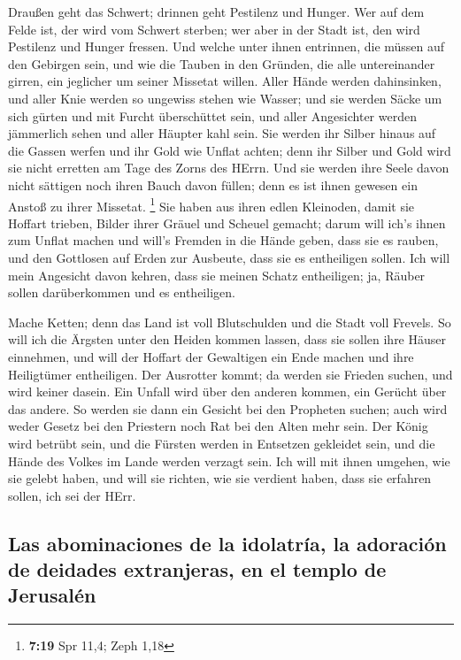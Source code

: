  Draußen geht das Schwert; drinnen geht Pestilenz und
Hunger. Wer auf dem Felde ist, der wird vom Schwert sterben; wer aber in
der Stadt ist, den wird Pestilenz und Hunger fressen. 
Und welche unter ihnen entrinnen, die müssen auf den Gebirgen sein, und
wie die Tauben in den Gründen, die alle untereinander girren, ein
jeglicher um seiner Missetat willen.  Aller Hände werden
dahinsinken, und aller Knie werden so ungewiss stehen wie Wasser;
 und sie werden Säcke um sich gürten und mit Furcht
überschüttet sein, und aller Angesichter werden jämmerlich sehen und
aller Häupter kahl sein.  Sie werden ihr Silber hinaus
auf die Gassen werfen und ihr Gold wie Unflat achten; denn ihr Silber
und Gold wird sie nicht erretten am Tage des Zorns des HErrn. Und sie
werden ihre Seele davon nicht sättigen noch ihren Bauch davon füllen;
denn es ist ihnen gewesen ein Anstoß zu ihrer Missetat. \footnote{\textbf{7:19}
  Spr 11,4; Zeph 1,18}  Sie haben aus ihren edlen
Kleinoden, damit sie Hoffart trieben, Bilder ihrer Gräuel und Scheuel
gemacht; darum will ich's ihnen zum Unflat machen  und
will's Fremden in die Hände geben, dass sie es rauben, und den Gottlosen
auf Erden zur Ausbeute, dass sie es entheiligen sollen. 
Ich will mein Angesicht davon kehren, dass sie meinen Schatz
entheiligen; ja, Räuber sollen darüberkommen und es entheiligen.

 Mache Ketten; denn das Land ist voll Blutschulden und
die Stadt voll Frevels.  So will ich die Ärgsten unter
den Heiden kommen lassen, dass sie sollen ihre Häuser einnehmen, und
will der Hoffart der Gewaltigen ein Ende machen und ihre Heiligtümer
entheiligen.  Der Ausrotter kommt; da werden sie Frieden
suchen, und wird keiner dasein.  Ein Unfall wird über den
anderen kommen, ein Gerücht über das andere. So werden sie dann ein
Gesicht bei den Propheten suchen; auch wird weder Gesetz bei den
Priestern noch Rat bei den Alten mehr sein.  Der König
wird betrübt sein, und die Fürsten werden in Entsetzen gekleidet sein,
und die Hände des Volkes im Lande werden verzagt sein. Ich will mit
ihnen umgehen, wie sie gelebt haben, und will sie richten, wie sie
verdient haben, dass sie erfahren sollen, ich sei der HErr.

\hypertarget{las-abominaciones-de-la-idolatruxeda-la-adoraciuxf3n-de-deidades-extranjeras-en-el-templo-de-jerusaluxe9n}{%
\subsection{Las abominaciones de la idolatría, la adoración de deidades
extranjeras, en el templo de
Jerusalén}\label{las-abominaciones-de-la-idolatruxeda-la-adoraciuxf3n-de-deidades-extranjeras-en-el-templo-de-jerusaluxe9n}}

